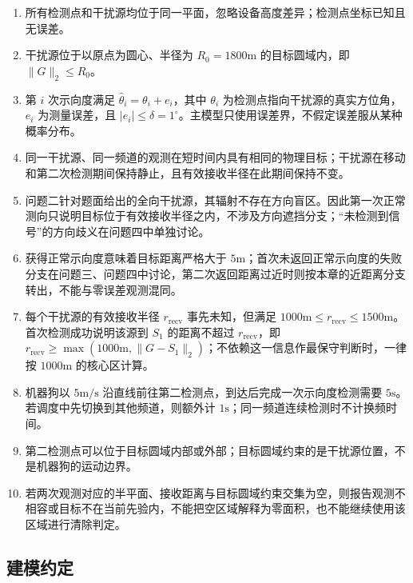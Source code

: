 \begin{enumerate}
\item 所有检测点和干扰源均位于同一平面，忽略设备高度差异；检测点坐标已知且无误差。
\item 干扰源位于以原点为圆心、半径为 $R_0=1800\mathrm{m}$ 的目标圆域内，即 $\lVert G\rVert_2\le R_0$。
\item 第 $i$ 次示向度满足 $\hat\theta_i=\theta_i+e_i$，其中 $\theta_i$ 为检测点指向干扰源的真实方位角，$e_i$ 为测量误差，且 $|e_i|\le\delta=1^\circ$。主模型只使用误差界，不假定误差服从某种概率分布。
\item 同一干扰源、同一频道的观测在短时间内具有相同的物理目标；干扰源在移动和第二次检测期间保持静止，且有效接收半径在此期间保持不变。
\item 问题二针对题面给出的全向干扰源，其辐射不存在方向盲区。因此第一次正常测向只说明目标位于有效接收半径之内，不涉及方向遮挡分支；“未检测到信号”的方向歧义在问题四中单独讨论。
\item 获得正常示向度意味着目标距离严格大于 $5\mathrm{m}$；首次未返回正常示向度的失败分支在问题三、问题四中讨论，第二次返回距离过近时则按本章的近距离分支转出，不能与零误差观测混同。
\item 每个干扰源的有效接收半径 $r_{\mathrm{recv}}$ 事先未知，但满足 $1000\mathrm{m}\le r_{\mathrm{recv}}\le1500\mathrm{m}$。首次检测成功说明该源到 $S_1$ 的距离不超过 $r_{\mathrm{recv}}$，即 $r_{\mathrm{recv}}\ge\max\left(1000\mathrm{m},\lVert G-S_1\rVert_2\right)$；不依赖这一信息作最保守判断时，一律按 $1000\mathrm{m}$ 的核心区计算。
\item 机器狗以 $5\mathrm{m/s}$ 沿直线前往第二检测点，到达后完成一次示向度检测需要 $5\mathrm{s}$。若调度中先切换到其他频道，则额外计 $1\mathrm{s}$；同一频道连续检测时不计换频时间。
\item 第二检测点可以位于目标圆域内部或外部；目标圆域约束的是干扰源位置，不是机器狗的运动边界。
\item 若两次观测对应的半平面、接收距离与目标圆域约束交集为空，则报告观测不相容或目标不在当前先验内，不能把空区域解释为零面积，也不能继续使用该区域进行清除判定。
\end{enumerate}

\subsection{建模约定}

